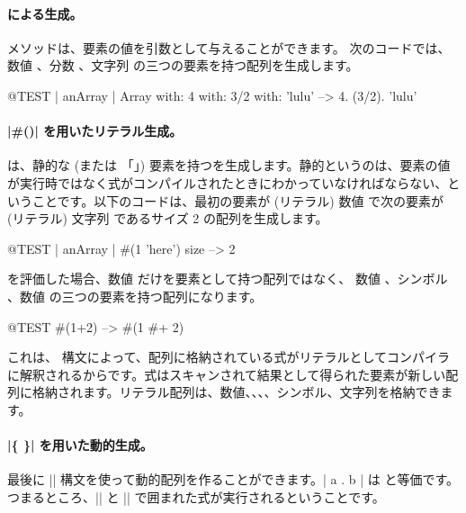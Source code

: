 \documentclass[a4paper,10pt,twoside]{book}
\begin{document}
\paragraph{ による生成。}  メソッドは、要素の値を引数として与えることができます。
次のコードでは、数値 、分数 、文字列  の三つの要素を持つ配列を生成します。

\begin{code}{@TEST | anArray |}
Array with: 4 with: 3/2 with: 'lulu' -->  {4. (3/2). 'lulu'}
\end{code}

\paragraph{\ct|\#()| を用いたリテラル生成。}
\ct{#()} は、静的な (または 「」) 要素を持つを生成します。静的というのは、要素の値が実行時ではなく式がコンパイルされたときにわかっていなければならない、ということです。以下のコードは、最初の要素が (リテラル) 数値  で次の要素が (リテラル) 文字列  であるサイズ 2 の配列を生成します。


\begin{code}{@TEST | anArray |}
#(1 'here') size --> 2
\end{code}

 を評価した場合、数値  だけを要素として持つ配列ではなく、 \ie 数値 、シンボル \ct{#+}、数値  の三つの要素を持つ配列になります。

\begin{code}{@TEST}
#(1+2) -->  #(1 #+ 2)
\end{code}

\noindent
これは、\ct{#()} 構文によって、配列に格納されている式がリテラルとしてコンパイラに解釈されるからです。式はスキャンされて結果として得られた要素が新しい配列に格納されます。リテラル配列は、数値、、、、シンボル、文字列を格納できます。

\paragraph{\ct|\{ \}| を用いた動的生成。}
最後に \ct|{}| 構文を使って動的配列を作ることができます。\ct|{ a . b }| は  と等価です。つまるところ、\ct|{| と \ct|}| で囲まれた式が実行されるということです。
\end{document}
